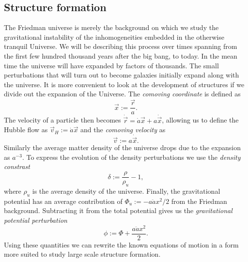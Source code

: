 \begin{subappendices}

\clearpage
\section{Structure formation}\label{section:structure-formation}
The Friedman universe is merely the background on which we study the gravitational instability of the inhomogeneities embedded in the otherwise tranquil Universe. We will be describing this process over times spanning from the first few hundred thousand years after the big bang, to today. In the mean time the universe will have expanded by factors of thousands. The small perturbations that will turn out to become galaxies initially expand along with the universe. It is more convenient to look at the development of structures if we divide out the expansion of the Universe. The \emph{comoving coordinate} is defined as
\[\vec{x} := \frac{\vec{r}}{a}.\]
The velocity of a particle then becomes
$\dot{\vec{r}} = \dot{a}\vec{x} + a\dot{\vec{x}}$,
allowing us to define the Hubble flow as $\vec{v}_H := \dot{a}\vec{x}$ and the \emph{comoving velocity} as \[\vec{v} := a\dot{\vec{x}}.\] Similarly the average matter density of the universe drops due to the expansion as $a^{-3}$. To express the evolution of the density perturbations we use the \emph{density constrast}
\[\delta := \frac{\rho}{\rho_u} - 1,\]
where $\rho_u$ is the average density of the universe.
Finally, the gravitational potential has an average contribution of $\Phi_u := - a\ddot{a}x^2/2$ from the Friedman background. Subtracting it from the total potential gives us the \emph{gravitational potential perturbation}
\[\phi := \Phi + \frac{a\ddot{a}x^2}{2}.\]
Using these quantities we can rewrite the known equations of motion in a form more suited to study large scale structure formation.


\end{subappendices}
